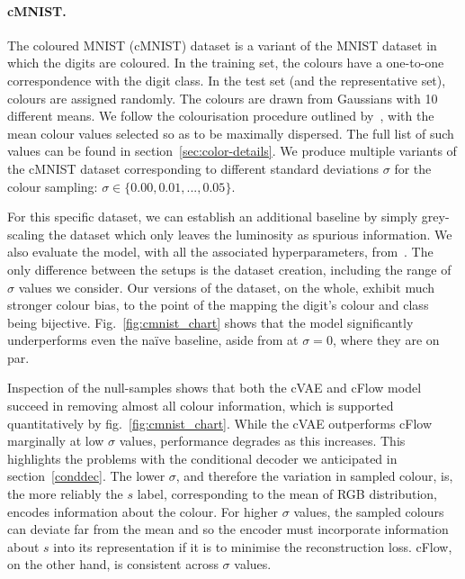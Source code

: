 \paragraph{cMNIST.}
The coloured MNIST (cMNIST) dataset is a variant of the MNIST dataset in which the digits are coloured.
In the training set, the colours have a one-to-one correspondence with the digit class.
In the test set (and the representative set), colours are assigned randomly.
The colours are drawn from Gaussians with 10 different means.
We follow the colourisation procedure outlined by~\citet{kim2019learning}, with the mean colour values selected so as to be maximally dispersed.
The full list of such values can be found in section~\ref{sec:color-details}.
We produce multiple variants of the cMNIST dataset corresponding to different standard deviations $\sigma$ for the colour sampling:
$\sigma \in \{0.00, 0.01, ..., 0.05 \}$.

For this specific dataset, we can establish an additional baseline by simply grey-scaling the dataset
which only leaves the luminosity as spurious information.
We also evaluate the model, with all the associated hyperparameters, from~\citet{kim2019learning}.
The only difference between the setups is the dataset creation, including the range of $\sigma$ values we consider.
Our versions of the dataset, on the whole, exhibit much stronger colour bias, to the point of the mapping the digit's colour and class being bijective.
Fig.~\ref{fig:cmnist_chart} shows that the model significantly underperforms even the na\"ive baseline, aside from at $\sigma = 0$, where they are on par.

Inspection of the null-samples shows that both the cVAE and cFlow model succeed in removing almost all colour information, which is supported quantitatively by fig.~\ref{fig:cmnist_chart}.
While the cVAE outperforms cFlow marginally at low $\sigma$ values, performance degrades
as this increases.
This highlights the problems with the conditional decoder we anticipated in section~\ref{conddec}.
The lower $\sigma$, and therefore the variation in sampled colour, is, the more reliably the $s$ label, corresponding to the mean of RGB distribution, encodes information about the colour.
For higher $\sigma$ values, the sampled colours can deviate far from the mean and so the encoder must incorporate information about $s$ into its representation if it is to minimise the reconstruction loss.
cFlow, on the other hand, is consistent across $\sigma$ values.

